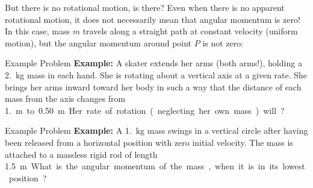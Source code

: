 \documentclass[12pt,compress,aspectratio=169]{beamer}
\begin{document}
\begin{frame}{But there is no rotational motion, is there?}
  Even when there is no apparent rotational motion, it does not necessarily
  mean that angular momentum is zero! In this case, mass $m$ travels along a
  straight path at constant velocity (uniform motion), but the angular momentum
  around point $P$ is not zero:
  \begin{center}
  \end{center}
\end{frame}



\begin{frame}{Example Problem}
  \textbf{Example:} A skater extends her arms (both arms!), holding a
  \SI{2.}{\kilo\gram} mass in each hand. She is rotating about a vertical axis
  at a given rate. She brings her arms inward toward her body in such a way that
  the distance of each mass from the axis changes from \SI{1.}\metre to
  \SI{.50}\metre. Her rate of rotation (neglecting her own mass) will?
\end{frame}




\begin{frame}{Example Problem}
  \textbf{Example:} A \SI{1.}{\kilo\gram} mass swings in a vertical circle
  after having been released from a horizontal position with zero initial
  velocity. The mass is attached to a massless rigid rod of length
  \SI{1.5}\metre. What is the angular momentum of the mass, when it is in its
  lowest position?
\end{frame}
\end{document}
